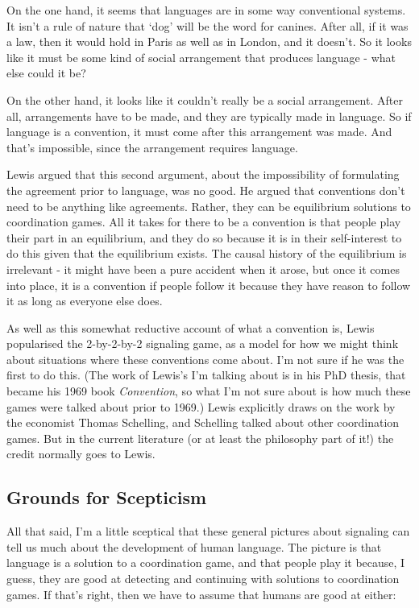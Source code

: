 \documentclass[
  11pt,
]{article}
\begin{document}
On the one hand, it seems that languages are in some way conventional
systems. It isn't a rule of nature that `dog' will be the word for
canines. After all, if it was a law, then it would hold in Paris as well
as in London, and it doesn't. So it looks like it must be some kind of
social arrangement that produces language - what else could it be?

On the other hand, it looks like it couldn't really be a social
arrangement. After all, arrangements have to be made, and they are
typically made in language. So if language is a convention, it must come
after this arrangement was made. And that's impossible, since the
arrangement requires language.

Lewis argued that this second argument, about the impossibility of
formulating the agreement prior to language, was no good. He argued that
conventions don't need to be anything like agreements. Rather, they can
be equilibrium solutions to coordination games. All it takes for there
to be a convention is that people play their part in an equilibrium, and
they do so because it is in their self-interest to do this given that
the equilibrium exists. The causal history of the equilibrium is
irrelevant - it might have been a pure accident when it arose, but once
it comes into place, it is a convention if people follow it because they
have reason to follow it as long as everyone else does.

As well as this somewhat reductive account of what a convention is,
Lewis popularised the 2-by-2-by-2 signaling game, as a model for how we
might think about situations where these conventions come about. I'm not
sure if he was the first to do this. (The work of Lewis's I'm talking
about is in his PhD thesis, that became his 1969 book \emph{Convention},
so what I'm not sure about is how much these games were talked about
prior to 1969.) Lewis explicitly draws on the work by the economist
Thomas Schelling, and Schelling talked about other coordination games.
But in the current literature (or at least the philosophy part of it!)
the credit normally goes to Lewis.

\hypertarget{grounds-for-scepticism}{%
\subsection{Grounds for Scepticism}\label{grounds-for-scepticism}}

All that said, I'm a little sceptical that these general pictures about
signaling can tell us much about the development of human language. The
picture is that language is a solution to a coordination game, and that
people play it because, I guess, they are good at detecting and
continuing with solutions to coordination games. If that's right, then
we have to assume that humans are good at either:
\end{document}
